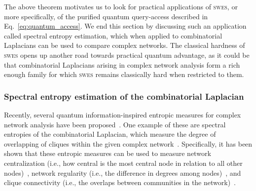 \documentclass[a4paper, onecolumn, accepted=2022-08-28]{quantumarticle}
\begin{document}
The above theorem motivates us to look for practical applications of \textsc{swes}, or more specifically, of the purified quantum query-access described in Eq.~\eqref{eq:quantum_access}.
We end this section by discussing such an application called spectral entropy estimation, which when applied to combinatorial Laplacians can be used to compare complex networks.
The classical hardness of \textsc{swes} opens up another road towards practical quantum advantage, as it could be that combinatorial Laplacians arising in complex network analysis form a rich enough family for which \textsc{swes} remains classically hard when restricted to them.

\subsubsection{Spectral entropy estimation of the combinatorial Laplacian
\label{sucsubsec:spectral_entropy}}

Recently, several quantum information-inspired entropic measures for complex network analysis have been proposed~\cite{biamonte:entropy_complex_network_nature, domenico:entropy_complex_network_prx}.
One example of these are spectral entropies of the combinatorial Laplacian, which measure the degree of overlapping of cliques within the given complex network~\cite{passerini:entropy_complex_network, simmons:entropy_complex_network, maletic:entropy_complex_network}.
Specifically, it has been shown that these entropic measures can be used to measure network centralization (i.e., how central is the most central node in relation to all other nodes)~\cite{simmons:entropy_complex_network}, network regularity (i.e., the difference in degrees among nodes)~\cite{passerini:entropy_complex_network}, and clique connectivity (i.e., the overlaps between communities in the network)~\cite{maletic:entropy_complex_network}. 
\end{document}
